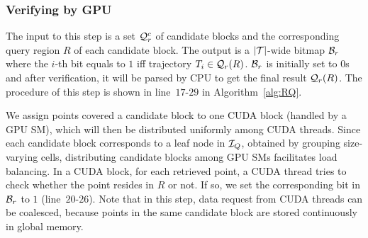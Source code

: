 \documentclass[10pt,conference,letterpaper]{IEEEtran}
\newcommand{\rangeq}{{{\cal Q}_r}\xspace}
\newcommand{\rangecand}{{{\cal Q}_r^c}\xspace}
\newcommand{\alltraj}{{{\cal T}}\xspace}
\newcommand{\trajtable}{{\cal S}\xspace}
\newcommand{\treeindex}{{{\cal I}_Q}\xspace}
\begin{document}
%



\subsubsection{Verifying by GPU}

The input to this step is a set $\rangecand$ of candidate blocks and the corresponding query region $R$ of each candidate block. The output is a $|\alltraj|$-wide bitmap ${\cal B}_r$ where the $i$-th bit equals to $1$ iff trajectory $T_i\in \rangeq(R)$. ${\cal B}_r$ is initially set to $0$s and after verification, it will be parsed by CPU to get the final result $\rangeq(R)$. The procedure of this step is shown in line~$17$-$29$ in Algorithm~\ref{alg:RQ}.

%
%
We assign points covered a candidate block to one CUDA block (handled by a GPU SM), which will then be distributed uniformly among CUDA threads. Since each candidate block corresponds to a leaf node in $\treeindex$, obtained by grouping size-varying cells, distributing candidate blocks among GPU SMs facilitates load balancing. In a CUDA block, for each retrieved point, a CUDA thread tries to check whether the point resides in $R$ or not. If so, we set the corresponding bit in ${\cal B}_r$ to $1$ (line~$20$-$26$). Note that in this step, data request from CUDA threads can be coalesced, because points in the same candidate block are stored continuously in global memory.
\end{document}
